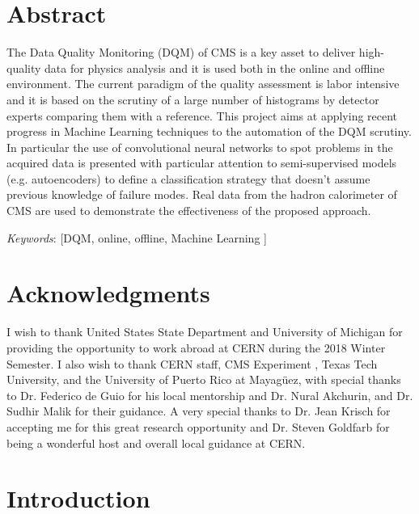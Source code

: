 \documentclass[12pt,twoside,openany]{book}
\begin{document}


\frontmatter

\doublespace
\chapter{Abstract}
The Data Quality Monitoring (DQM) of CMS is a key asset to deliver high-quality data for physics analysis and it is used both in the online and offline environment. The current paradigm of the quality assessment is labor intensive and it is based on the scrutiny of a large number of histograms by detector experts comparing them with a reference. This project aims at applying recent progress in Machine Learning techniques to the automation of the DQM scrutiny. In particular the use of convolutional neural networks to spot problems in the acquired data is presented with particular attention to semi-supervised models (e.g. autoencoders) to define a classification strategy that doesn’t assume previous knowledge of failure modes. Real data from the hadron calorimeter of CMS are used to demonstrate the effectiveness of the proposed approach. 

\vspace*{1cm}

\textit{Keywords}:  [DQM, online, offline, Machine Learning ]

\chapter{Acknowledgments}

I wish to thank United States State Department and University of Michigan for providing the opportunity to work abroad at CERN during the 2018 Winter Semester. I also wish to thank CERN staff, CMS Experiment , Texas Tech University, and the University of Puerto Rico at Mayagüez, with special thanks to Dr. Federico de Guio for his local mentorship and Dr. Nural Akchurin, and Dr. Sudhir Malik for their guidance. A very special thanks to Dr. Jean Krisch for accepting me for this great research opportunity and Dr. Steven Goldfarb for being a wonderful host and overall local guidance at CERN.
\singlespace

\listoffigures

\tableofcontents


\doublespace
\mainmatter
\chapter{Introduction}

\end{document}
